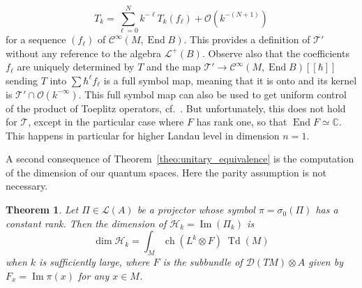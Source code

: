 \documentclass[10pt,a4paper]{article}
\newtheorem{theo}{Theorem}[section]
\theoremstyle{definition}
\numberwithin{equation}{section}
\newcommand{\C}{{\mathbb{C}}}
\newcommand{\si}{{\sigma}}
\newcommand{\op}{\operatorname}
\newcommand{\Ci}{{\mathcal{C}}^{\infty}}
\newcommand{\bigo}{\mathcal{O}}
\newcommand{\D}{\mathcal{D}}
\newcommand{\lag}{\mathcal{L}}
\newcommand{\Hilb}{\mathcal{H}}
\newcommand{\clT}{\mathcal{T}}
\begin{document}
\[
T_k = \sum_{\ell =0}^{N} k^{-\ell} T_{k} (f_\ell) + \bigo \left(k^{-(N+1)}\right)
\]
for a sequence $(f_\ell)$ of $\Ci (M, \op{End} B)$. This provides a definition of $\clT'$ without any reference to the algebra $\lag ^{+} (B)$. Observe also that the coefficients $f_{\ell}$ are uniquely determined by $T$ and the map $\clT' \rightarrow \Ci (M, \op{End} B) [[\hbar]]$ sending $T$ into $\sum \hbar^\ell f_{\ell}$ is a full symbol map, meaning that it is onto and its kernel is $\clT' \cap \bigo (k^{-\infty})$. This full symbol map can also be used to get uniform control of the product of Toeplitz operators, cf.~\cite{oim}. But unfortunately, this does not hold for $\clT$, except in the particular case where $F$ has rank one, so that $\op{End} F \simeq \C$. This happens in particular for higher Landau level in dimension $n=1$.

A second consequence of Theorem~\ref{theo:unitary_equivalence} is the computation of the dimension of our quantum spaces.  Here the parity assumption is not necessary.


\begin{theo}\label{theo:dim_general}
Let $\Pi \in \lag (A)$ be a projector whose symbol $\pi = \si_0 (\Pi)$ has a constant rank. Then the dimension of $\Hilb_k= \op{Im}(\Pi_k)$ is
\[
\op{dim} \Hilb_k = \int_M \op{ch} \left(L^k \otimes F\right) \; \op{Td}
(M)
\]
when $k$ is sufficiently large, where $F$ is the subbundle of $\D (TM) \otimes A$ given by $F_x = \op{Im} \pi (x)$ for any $x \in M$.
\end{theo}
\end{document}

